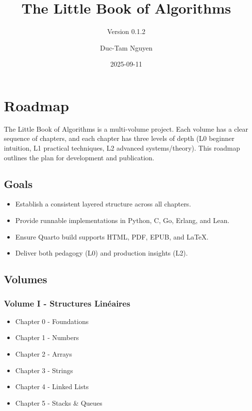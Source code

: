 \documentclass[
  letterpaper,
  DIV=11,
  numbers=noendperiod]{scrreprt}
\title{The Little Book of Algorithms}
\subtitle{Version 0.1.2}
\author{Duc-Tam Nguyen}
\date{2025-09-11}
\providecommand{\tightlist}{%
  \setlength{\itemsep}{0pt}\setlength{\parskip}{0pt}}
\renewcommand*\contentsname{Table of contents}
\newcommand\contentsname{Table of contents}
\begin{document}
\maketitle

\renewcommand*\contentsname{Table of contents}
{
\hypersetup{linkcolor=}
\setcounter{tocdepth}{2}
\tableofcontents
}


\chapter{Roadmap}\label{roadmap}

The Little Book of Algorithms is a multi-volume project. Each volume has
a clear sequence of chapters, and each chapter has three levels of depth
(L0 beginner intuition, L1 practical techniques, L2 advanced
systems/theory). This roadmap outlines the plan for development and
publication.

\section{Goals}\label{goals}

\begin{itemize}
\tightlist
\item
  Establish a consistent layered structure across all chapters.
\item
  Provide runnable implementations in Python, C, Go, Erlang, and Lean.
\item
  Ensure Quarto build supports HTML, PDF, EPUB, and LaTeX.
\item
  Deliver both pedagogy (L0) and production insights (L2).
\end{itemize}

\section{Volumes}\label{volumes}

\subsection{Volume I - Structures
Linéaires}\label{volume-i---structures-linuxe9aires}

\begin{itemize}
\tightlist
\item
  Chapter 0 - Foundations
\item
  Chapter 1 - Numbers
\item
  Chapter 2 - Arrays
\item
  Chapter 3 - Strings
\item
  Chapter 4 - Linked Lists
\item
  Chapter 5 - Stacks \& Queues
\end{itemize}
\end{document}
